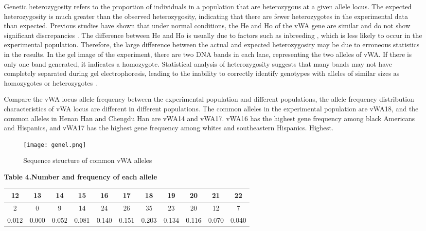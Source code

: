 \documentclass[a4paper,10pt]{article}
\begin{document}
\begin{multicols}{2}
Genetic heterozygosity refers to the proportion of individuals in a population that are heterozygous at a given allele locus. The expected heterozygosity is much greater than the observed heterozygosity, indicating that there are fewer heterozygotes in the experimental data than expected. Previous studies have shown that under normal conditions, the He and Ho of the vWA gene are similar and do not show significant discrepancies \cite{foroughmand2014genetic}. The difference between He and Ho is usually due to factors such as inbreeding \cite{aguiar2011updated}, which is less likely to occur in the experimental population. Therefore, the large difference between the actual and expected heterozygosity may be due to erroneous statistics in the results. In the gel image of the experiment, there are two DNA bands in each lane, representing the two alleles of vWA. If there is only one band generated, it indicates a homozygote. Statistical analysis of heterozygosity suggests that many bands may not have completely separated during gel electrophoresis, leading to the inability to correctly identify genotypes with alleles of similar sizes as homozygotes or heterozygotes \cite{yunis2005population}.

Compare the vWA locus allele frequency between the experimental population and different populations, the allele frequency distribution characteristics of vWA locus are different in different populations. The common alleles in the experimental population are vWA18, and the common alleles in Henan Han and Chengdu Han are vWA14 and vWA17. vWA16 has the highest gene frequency among black Americans and Hispanics, and vWA17 has the highest gene frequency among whites and southeastern Hispanics. Highest.

\begin{figure}[H]
\centering
\texttt{[image: genel.png]}
\caption{Sequence structure of common vWA alleles} \label{fig3}
\end{figure}

\end{multicols}


\begin{center}
\textbf{Table 4.Number and frequency of each allele}
\vspace{0pt}
\begin{tabular}{ccccccccccc}
\toprule [1.5pt]
12&13&14&15&16&17&18&19&20&21&22\\
\hline
2&0&9&14&24&26&35&23&20&12&7\\
0.012&0.000&0.052&0.081&0.140&0.151&0.203&0.134&0.116&0.070&0.040\\
\bottomrule
\end{tabular}
\end{center}
\end{document}
